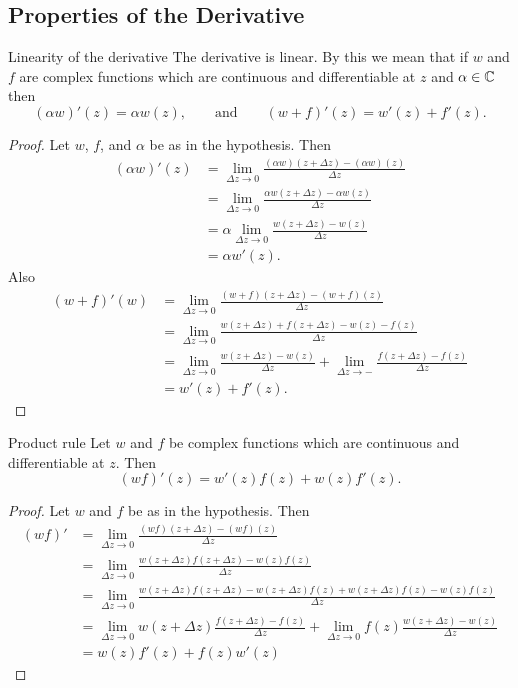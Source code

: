 \documentclass{article}
\begin{document}
    \subsection{Properties of the Derivative}
    \begin{lemma}{Linearity of the derivative}{}
        The derivative is linear.
        By this we mean that if \(w\) and \(f\) are complex functions which are continuous and differentiable at \(z\) and \(\alpha\in\mathbb{C}\) then
        \[(\alpha w)'(z) = \alpha w(z),\qquad\text{and}\qquad (w + f)'(z) = w'(z) + f'(z).\]
    \end{lemma}
    \begin{proof}
        Let \(w\), \(f\), and \(\alpha\) be as in the hypothesis.
        Then
        \begin{align*}
            (\alpha w)'(z) &= \lim_{\Delta z\to 0} \frac{(\alpha w)(z + \Delta z) - (\alpha w)(z)}{\Delta z}\\
            &= \lim_{\Delta z\to 0} \frac{\alpha w(z + \Delta z) - \alpha w(z)}{\Delta z}\\
            &= \alpha\lim_{\Delta z \to 0} \frac{w(z + \Delta z) - w(z)}{\Delta z}\\
            &= \alpha w'(z).
        \end{align*}
        Also
        \begin{align*}
            (w + f)'(w) &= \lim_{\Delta z \to 0} \frac{(w + f)(z + \Delta z) - (w + f)(z)}{\Delta z}\\
            &= \lim_{\Delta z \to 0} \frac{w(z + \Delta z) + f(z + \Delta z) - w(z) - f(z)}{\Delta z}\\
            &= \lim_{\Delta z\to 0} \frac{w(z + \Delta z) - w(z)}{\Delta z} + \lim_{\Delta z \to -} \frac{f(z + \Delta z) - f(z)}{\Delta z}\\
            &= w'(z) + f'(z).
        \end{align*}
    \end{proof}
    \begin{lemma}{Product rule}{}
        Let \(w\) and \(f\) be complex functions which are continuous and differentiable at \(z\).
        Then
        \[(wf)'(z) = w'(z)f(z) + w(z)f'(z).\]
    \end{lemma}
    \begin{proof}
        Let \(w\) and \(f\) be as in the hypothesis.
        Then
        \begin{align*}
            (wf)' &= \lim_{\Delta z\to 0} \frac{(wf)(z + \Delta z) - (wf)(z)}{\Delta z}\\
            &= \lim_{\Delta z\to 0} \frac{w(z + \Delta z)f(z + \Delta z) - w(z)f(z)}{\Delta z}\\
            &= \lim_{\Delta z\to 0} \frac{w(z + \Delta z)f(z + \Delta z) - w(z + \Delta z)f(z) + w(z + \Delta z)f(z) - w(z)f(z)}{\Delta z}\\
            &= \lim_{\Delta z\to 0} w(z + \Delta z)\frac{f(z + \Delta z) - f(z)}{\Delta z} + \lim_{\Delta z \to 0} f(z)\frac{w(z + \Delta z) - w(z)}{\Delta z}\\
            &= w(z)f'(z) + f(z)w'(z)
        \end{align*}
    \end{proof}
\end{document}
